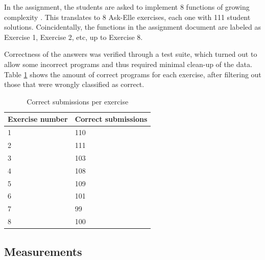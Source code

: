 

In the assignment, the students are asked to implement 8 functions of growing complexity \cite{assignment1}. This translates to 8 Ask-Elle exercises, each one with 111 student solutions. Coincidentally, the functions in the assignment document are labeled as Exercise 1, Exercise 2, etc, up to Exercise 8.

Correctness of the answers was verified through a test suite, which turned out to allow some incorrect programs and thus required minimal clean-up of the data. Table \ref{tb:correct-submissions-per-exercise} shows the amount of correct programs for each exercise, after filtering out those that were wrongly classified as correct.

\begin{table}[H]
\centering
\begin{tabular}{ m{12em} | m{12em} }
    Exercise number & Correct submissions \\
    \hline
    1 & 110 \\
    \hline
    2 & 111 \\
    \hline
    3 & 103 \\
    \hline
    4 & 108 \\
    \hline
    5 & 109 \\
    \hline
    6 & 101 \\
    \hline
    7 & 99 \\
    \hline
    8 & 100
\end{tabular}
\caption{Correct submissions per exercise}
\label{tb:correct-submissions-per-exercise}
\end{table}

\subsection{Measurements}
\label{sec:method-measurement-definitions}

